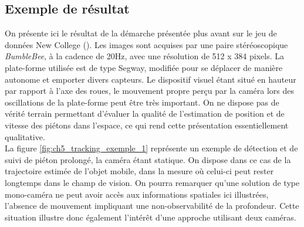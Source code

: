 \subsection{Exemple de résultat} \label{sec:ch5_exemple}
On présente ici le résultat de la démarche présentée plus avant sur le jeu de données \og New College\fg{} (\cite{Smith2009}). Les images sont acquises par une paire stéréoscopique \textit{BumbleBee}, à la cadence de 20Hz, avec une résolution de 512 x 384 pixels. La plate-forme utilisée est de type \og Segway\fg{}, modifiée pour se déplacer de manière autonome et emporter divers capteurs. Le dispositif visuel étant situé en hauteur par rapport à l'axe des roues, le mouvement propre perçu par la caméra lors des oscillations de la plate-forme peut être très important. On ne dispose pas de vérité terrain permettant d'évaluer la qualité de l'estimation de position et de vitesse des piétons dans l'espace, ce qui rend cette présentation essentiellement qualitative.\\
La figure \ref{fig:ch5_tracking_exemple_1} représente un exemple de détection et de suivi de piéton prolongé, la caméra étant statique. On dispose dans ce cas de la trajectoire estimée de l'objet mobile, dans la mesure où celui-ci peut rester longtemps dans le champ de vision. On pourra remarquer qu'une solution de type mono-caméra ne peut avoir accès aux informations spatiales ici illustrées, l'absence de mouvement impliquant une non-observabilité de la profondeur. Cette situation illustre donc également l'intérêt d'une approche utilisant deux caméras.


